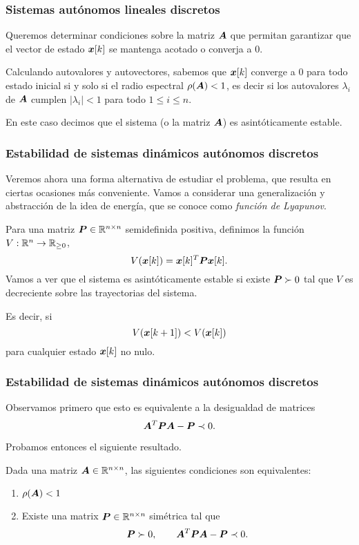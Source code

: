 \documentclass[aspectratio=169,12pt,spanish]{beamer}
\begin{document}

\begin{frame}
\frametitle{Sistemas autónomos lineales discretos}

Queremos determinar condiciones sobre la matriz $\bm{A}$ que permitan garantizar que el vector de estado $\bm{x}[k]$ se mantenga acotado o converja a 0.

Calculando autovalores y autovectores, sabemos que $\bm{x}[k]$ converge a 0 para todo estado inicial si y solo si el radio espectral $\rho(\bm{A}) < 1$, es decir si los autovalores $\lambda_i$ de $\bm{A}$ cumplen $|\lambda_i| < 1$ para todo $1 \le i \le n$.

En este caso decimos que el sistema (o la matriz $\bm{A}$) es asintóticamente estable.

\end{frame}



\begin{frame}
\frametitle{Estabilidad de sistemas dinámicos autónomos discretos}

Veremos ahora una forma alternativa de estudiar el problema, que resulta en ciertas ocasiones más conveniente. Vamos a considerar una generalización y abstracción de la idea de energía, que se conoce como \emph{función de Lyapunov}.

Para una matriz $\bm{P} \in \mathbb{R}^{n \times n}$  semidefinida positiva, definimos la función $V: \mathbb{R}^n \rightarrow \mathbb{R}_{\ge 0}$,
$$
V(\bm{x}[k]) = \bm{x}[k]^T \bm{P} \bm{x}[k].
$$
Vamos a ver que el sistema es asintóticamente estable si existe $\bm{P} \succ 0$ tal que $V$ es decreciente sobre las trayectorias del sistema.

Es decir, si
$$V(\bm{x}[k+1]) < V(\bm{x}[k])$$ para cualquier estado $\bm{x}[k]$ no nulo.

\end{frame}





\begin{frame}
\frametitle{Estabilidad de sistemas dinámicos autónomos discretos}

Observamos primero que esto es equivalente a la desigualdad de matrices
$$
\bm{A}^T \bm{P} \bm{A} - \bm{P} \prec 0.
$$


Probamos entonces el siguiente resultado.

\begin{theorem}
Dada una matriz $\bm{A} \in \mathbb{R}^{n \times n}$, las siguientes condiciones son equivalentes:
\begin{enumerate}
\item \label{item:rho} $\rho(\bm{A}) < 1$
\item \label{item:matrix} Existe una matrix $\bm{P} \in \mathbb{R}^{n \times n}$ simétrica tal que
$$
\bm{P} \succ 0, \quad \quad \bm{A}^T \bm{P} \bm{A} - \bm{P}  \prec 0.
$$
\end{enumerate}
\end{theorem}

\end{frame}
\end{document}
